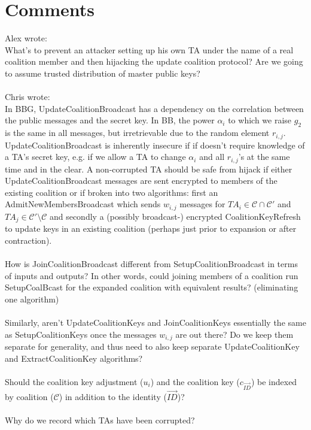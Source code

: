 \documentclass[10pt]{llncs}
\newcommand{\C}{\mathcal{C}}
\newcommand{\ID}{\mathit{ID}}
\newcommand{\TA}{\mathit{TA}}
\begin{document}
\section{Comments}
Alex wrote:\\
What's to prevent an attacker setting up his own TA under the name of a real coalition member and then hijacking the update coalition protocol? Are we going to assume trusted distribution of master public keys?\\\\
Chris wrote:\\
In BBG, UpdateCoalitionBroadcast has a dependency on the correlation between the public messages and the secret key.  In BB, the power $\alpha_i$ to which we raise $g_2$ is the same in all messages, but irretrievable due to the random element $r_{i,j}$.  UpdateCoalitionBroadcast is inherently insecure if if doesn't require knowledge of a TA's secret key, e.g. if we allow a TA to change $\alpha_i$ and all $r_{i,j}$'s at the same time and in the clear.  A non-corrupted TA should be safe from hijack if either UpdateCoalitionBroadcast messages are sent encrypted to members of the existing coalition or if broken into two algorithms: first an AdmitNewMembersBroadcast which sends $w_{i,j}$ messages for  $\TA_i \in \C \cap \C'$ and $\TA_j \in \C' \setminus \C$ and secondly a (possibly broadcast-) encrypted CoalitionKeyRefresh to update keys in an existing coalition (perhaps just prior to expansion or after contraction).\\\\
How is JoinCoalitionBroadcast different from SetupCoalitionBroadcast in terms of inputs and outputs?  In other words, could joining members of a coalition run SetupCoalBcast for the expanded coalition with equivalent results? (eliminating one algorithm)\\\\
Similarly, aren't UpdateCoalitionKeys and JoinCoalitionKeys essentially the same as SetupCoalitionKeys once the messages $w_{i,j}$ are out there? Do we keep them separate for generality, and thus need to also keep separate UpdateCoalitionKey and ExtractCoalitionKey algorithms?\\\\
Should the coalition key adjustment ($u_i$) and the coalition key ($c_{\vec{\ID}}$) be indexed by coalition ($\C$) in addition to the identity ($\vec{\ID}$)?\\\\
Why do we record which TAs have been corrupted?
\end{document}
